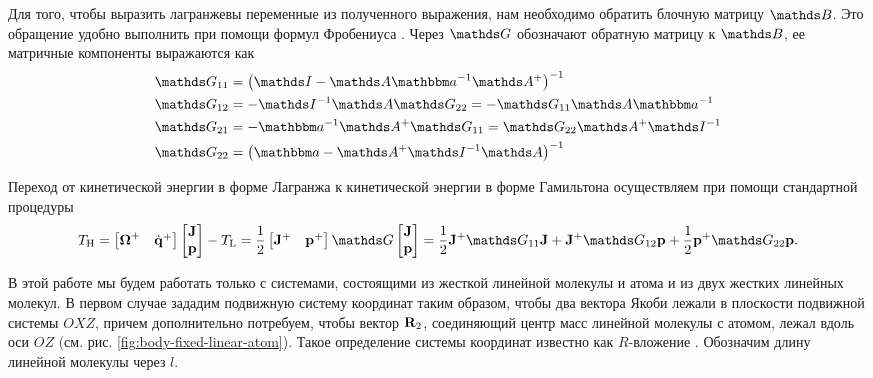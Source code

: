 Для того, чтобы выразить лагранжевы переменные из полученного выражения, нам необходимо обратить блочную матрицу $\bbB$. Это обращение удобно выполнить при помощи формул Фробениуса \cite{petrov2015, gantmaher}. Через $\bbG$ обозначают обратную матрицу к $\bbB$, ее матричные компоненты выражаются как
\begin{gather}
    \begin{aligned}
        \bbG_{11} &= \lb \bbI - \bbA \bba^{-1} \bbA^+ \rb^{-1} \\
        \bbG_{12} &= -\bbI^{-1} \bbA \bbG_{22} = -\bbG_{11} \bbA \bba^{-1} \\
        \bbG_{21} &= -\bba^{-1} \bbA^+ \bbG_{11} = \bbG_{22} \bbA^+ \bbI^{-1} \\
        \bbG_{22} &= \lb \bba - \bbA^+ \bbI^{-1} \bbA \rb^{-1}
    \end{aligned} \label{polyatom-frobenius}
\end{gather}

Переход от кинетической энергии в форме Лагранжа к кинетической энергии в форме Гамильтона осуществляем при помощи стандартной процедуры \cite{goldstein}
\begin{gather}
    \Th = \begin{bmatrix} \bOmega^+ & \dot{\mf{q}}^+ \end{bmatrix} \begin{bmatrix} \mf{J} \\ \mf{p} \end{bmatrix} - \Tl = \frac{1}{2} \begin{bmatrix} \mf{J}^+ & \mf{p}^+ \end{bmatrix} \bbG \begin{bmatrix} \mf{J} \\ \mf{p} \end{bmatrix} = \frac{1}{2} \mf{J}^+ \bbG_{11} \mf{J} + \mf{J}^+ \bbG_{12} \mf{p} + \frac{1}{2} \mf{p}^+ \bbG_{22} \mf{p}. 
\end{gather}

В этой работе мы будем работать только с системами, состоящими из жесткой линейной молекулы и атома и из двух жестких линейных молекул. В первом случае зададим подвижную систему координат таким образом, чтобы два вектора Якоби лежали в плоскости подвижной системы $OXZ$, причем дополнительно потребуем, чтобы вектор $\mathbf{R}_2$, соединяющий центр масс линейной молекулы с атомом, лежал вдоль оси $OZ$ (см. рис. \ref{fig:body-fixed-linear-atom}). Такое определение системы координат известно как $R$-вложение \cite{tennyson1986}. Обозначим длину линейной молекулы через $l$.
    
